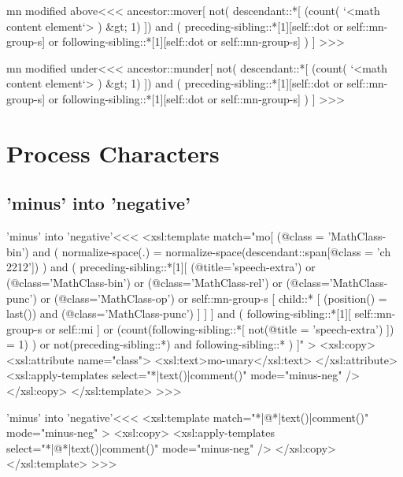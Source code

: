 \documentclass{article}
\begin{document}
\<mn modified above\><<<
ancestor::mover[
  not( descendant::*[
        (count( `<math content element`> ) &gt; 1)
     ])
  and
  (
     preceding-sibling::*[1][self::dot or self::mn-group-s]
     or
     following-sibling::*[1][self::dot or self::mn-group-s]
  )
] 
>>>



\<mn modified under\><<<
ancestor::munder[
  not( descendant::*[
        (count( `<math content element`> ) &gt; 1)
     ])
  and
  (
     preceding-sibling::*[1][self::dot or self::mn-group-s]
     or
     following-sibling::*[1][self::dot or self::mn-group-s]
  )
] 
>>>


\section{Process Characters}





\subsection{'minus' into 'negative'}



\<'minus' into 'negative'\><<<
<xsl:template match="mo[
    (@class = 'MathClass-bin')
  and
    ( normalize-space(.) =
      normalize-space(descendant::span[@class = 'ch 2212'])
    )
  and 
    (   preceding-sibling::*[1][
             (@title='speech-extra')
             or (@class='MathClass-bin')
             or (@class='MathClass-rel')  
             or (@class='MathClass-punc')  
             or (@class='MathClass-op')  
             or self::mn-group-s [ child::* [
                   (position() = last())
                  and
                   (@class='MathClass-punc')  
        ]       ] ]
        and
        (
           following-sibling::*[1][ self::mn-group-s 
                                 or self::mi ]
          or
           (count(following-sibling::*[
               not(@title = 'speech-extra')
            ]) = 1)
        )
      or
        not(preceding-sibling::*) and following-sibling::*
    )
]" >
  <xsl:copy>
    <xsl:attribute name="class">
       <xsl:text>mo-unary</xsl:text>
    </xsl:attribute>
    <xsl:apply-templates select="*|text()|comment()" 
                         mode="minus-neg" />
  </xsl:copy>
</xsl:template> 
>>>


\<'minus' into 'negative'\><<<
<xsl:template match="*|@*|text()|comment()" mode="minus-neg" >
  <xsl:copy>
    <xsl:apply-templates select="*|@*|text()|comment()" 
                         mode="minus-neg" />
  </xsl:copy>
</xsl:template> 
>>>
\end{document}

